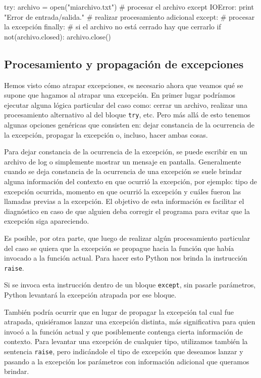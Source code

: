 \begin{codigo-python-sn}
try:
	archivo = open("miarchivo.txt")
	# procesar el archivo
except IOError:
	print "Error de entrada/salida."
	# realizar procesamiento adicional
except:
	# procesar la excepción
finally:
	# si el archivo no está cerrado hay que cerrarlo
	if not(archivo.closed):
		archivo.close()
\end{codigo-python-sn}

\subsection{Procesamiento y propagación de excepciones}

Hemos visto cómo atrapar excepciones, es necesario ahora que veamos qué se
supone que hagamos al atrapar una excepción. En primer lugar podríamos
ejecutar alguna lógica particular del caso como: cerrar un archivo,
realizar una procesamiento alternativo al del bloque \lstinline!try!, etc.
Pero más allá de esto tenemos algunas opciones genéricas que consisten en:
dejar constancia de la ocurrencia de la excepción, propagar la excepción o,
incluso, hacer ambas cosas.

Para dejar constancia de la ocurrencia de la excepción, se puede escribir
en un archivo de log o simplemente mostrar un mensaje en pantalla.
Generalmente cuando se deja constancia de la ocurrencia de una excepción se
suele brindar alguna información del contexto en que ocurrió la excepción,
por ejemplo: tipo de excepción ocurrida, momento en que ocurrió la
excepción y cuáles fueron las llamadas previas a la excepción. El objetivo
de esta información es facilitar el diagnóstico en caso de que alguien deba
corregir el programa para evitar que la excepción siga apareciendo.

Es posible, por otra parte, que luego de realizar algún procesamiento
particular del caso se quiera que la excepción se propague hacia la función
que había invocado a la función actual. Para hacer esto Python nos brinda
la instrucción \lstinline!raise!.

Si se invoca esta instrucción dentro de un bloque \lstinline!except!, sin
pasarle parámetros, Python levantará la excepción atrapada por ese bloque.

También podría ocurrir que en lugar de propagar la excepción tal cual fue
atrapada, quisiéramos lanzar una excepción distinta, más significativa para
quien invocó a la función actual y que posiblemente contenga cierta
información de contexto. Para levantar una excepción de cualquier tipo,
utilizamos también la sentencia \lstinline!raise!, pero indicándole el tipo
de excepción que deseamos lanzar y pasando a la excepción los parámetros
con información adicional que queramos brindar.

